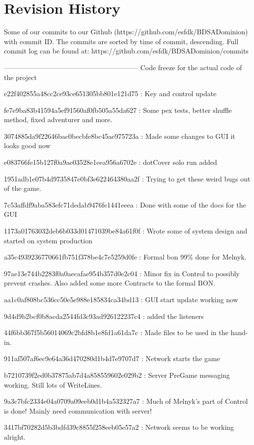 \section{Revision History}
Some of our commits to our Github (https://github.com/esfdk/BDSADominion)  with commit ID. The commits are sorted by time of commit, descending. Full commit log can be found at: https://github.com/esfdk/BDSADominion/commits



----------------------------------------------------------- Code freeze for the actual code of the project

e22f402855a48cc2ce93ce651305bb801e121d75 : Key and control update

fe7e9ba83b41594a5ef91560af0fb505a55da627 : Some pex tests, better shuffle method, fixed adventurer and more.

3074885da9f22646bac0becbfe8bc45ae975723a : Made some changes to GUI it looks good now

e083766fe15b127f0a9ae03528e1eea956a6702e : dotCover solo run added

1951adb1e07b4d9735847e0bf3e622464380aa2f : Trying to get these weird bugs out of the game.

7c53affdf9aba583efc71dedab9476fe1441eeea : Done with some of the docs for the GUI

1173a01763032deb6b033d01471039be84a61f0f : Wrote some of system design and started on system production

a35c4939236770661fb751f378be4c7e5259d0fe : Formal bon 99\% done for Melnyk.

97ae13e744b2283f0a0aecafae954b357d0e2c04 : Minor fix in Control to possibly prevent crashes. Also added some more Contracts to the formal BON.

aa1c0af808bc536cc50e5e988e185834ca34bd13 : GUI start update working now

9d4d9b2bcf0b8acda2544fd3c93ad926122237c4 : added the listeners

44f6bb367f5b56014069c2bfd8b1e8fd1a61da7c : Made files to be used in the hand-in.

911af507af6ec9e64a36d470280d1b4d7e9707d7 : Network starts the game

b7210739f2ed0b37875ab7d4a858559602e029b2 : Server PreGame messaging working. Still lots of WriteLines.

9a3c7bfc2334e04a0709a09eeb0d1b4a532327a7 : Much of Melnyk's part of Control is done! Mainly need communication with server!

3417bf70282d5b3bdfd39c8855f258eeb05e57a2 : Network seems to be working alright.

